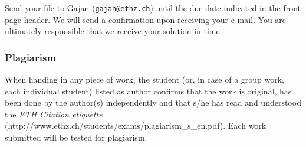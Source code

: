 \documentclass[uebung]{ETHIDSCprogramming_dpoc}
\begin{document}
Send your file to Gajan ({\tt gajan@ethz.ch}) until the due date indicated in the front page header.  We will send a confirmation upon receiving your e-mail.  You are ultimately responsible that we receive your solution in time.


\subsubsection*{Plagiarism}
When handing in any piece of work, the student (or, in case of a group work, each individual student) listed as author confirms that the work is original, has been done by the author(s) independently and that s/he has read and understood the \textit{ETH Citation etiquette} (http://www.ethz.ch/students/exams/plagiarism\_s\_en.pdf). Each work submitted will be tested for plagiarism.
\end{document}
